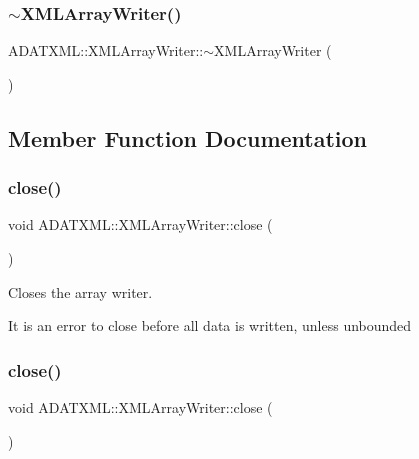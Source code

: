 \subsubsection{\texorpdfstring{$\sim$XMLArrayWriter()}{~XMLArrayWriter()}\hspace{0.1cm}{\footnotesize\ttfamily [3/3]}}
{\footnotesize\ttfamily A\+D\+A\+T\+X\+M\+L\+::\+X\+M\+L\+Array\+Writer\+::$\sim$\+X\+M\+L\+Array\+Writer (\begin{DoxyParamCaption}{ }\end{DoxyParamCaption})}



\subsection{Member Function Documentation}
\mbox{\label{classADATXML_1_1XMLArrayWriter_a89774ac16fd8636da94745ccba7add0a}} 
\subsubsection{\texorpdfstring{close()}{close()}\hspace{0.1cm}{\footnotesize\ttfamily [1/3]}}
{\footnotesize\ttfamily void A\+D\+A\+T\+X\+M\+L\+::\+X\+M\+L\+Array\+Writer\+::close (\begin{DoxyParamCaption}{ }\end{DoxyParamCaption})}



Closes the array writer. 

It is an error to close before all data is written, unless unbounded \mbox{\label{classADATXML_1_1XMLArrayWriter_a89774ac16fd8636da94745ccba7add0a}} 
\subsubsection{\texorpdfstring{close()}{close()}\hspace{0.1cm}{\footnotesize\ttfamily [2/3]}}
{\footnotesize\ttfamily void A\+D\+A\+T\+X\+M\+L\+::\+X\+M\+L\+Array\+Writer\+::close (\begin{DoxyParamCaption}{ }\end{DoxyParamCaption})}



